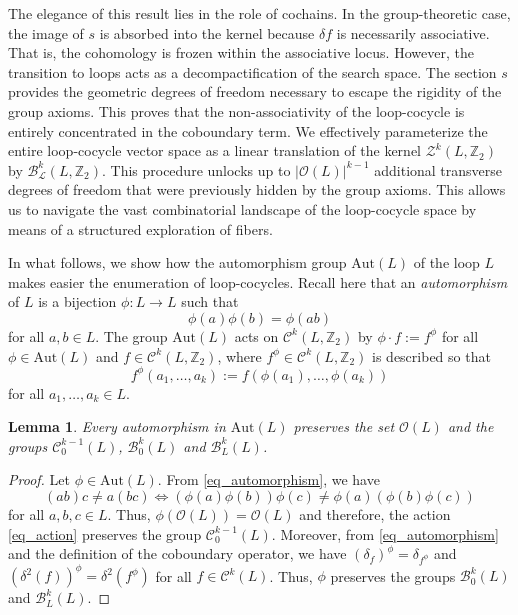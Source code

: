 \documentclass[11pt,a4paper]{article}
\newtheorem{lemma}[theorem]{Lemma}
\begin{document}
The elegance of this result lies in the role of cochains. In the group-theoretic case, the image of $s$ is absorbed into the kernel because $\delta f$ is necessarily associative. That is, the cohomology is frozen within the associative locus. However, the transition to loops acts as a decompactification of the search space. The section $s$ provides the geometric degrees of freedom necessary to escape the rigidity of the group axioms. This proves that the non-associativity of the loop-cocycle is entirely concentrated in the coboundary term. We effectively parameterize the entire loop-cocycle vector space as a linear translation of the kernel $\mathcal{Z}^k(L,\mathbb{Z}_2)$ by $\mathcal{B}^k_\mathcal{L}(L,\mathbb{Z}_2)$. This procedure unlocks up to $|\mathcal{O}(L)|^{k-1}$ additional transverse degrees of freedom that were previously hidden by the group axioms. This allows us to navigate the vast combinatorial landscape of the loop-cocycle space by means of a structured exploration of fibers.

In what follows, we show how the automorphism group $\mathrm{Aut}(L)$ of the loop $L$ makes easier the enumeration of loop-cocycles. Recall here that an {\em automorphism} of $L$ is a bijection $\phi:L\to L$ such that
\begin{equation}\label{eq_automorphism}
\phi(a)\phi(b)=\phi(ab)
\end{equation}
for all $a,b\in L$. The group $\mathrm{Aut}(L)$ acts on $\mathcal{C}^k(L,\mathbb{Z}_2)$ by $\phi\cdot f := f^\phi$ for all $\phi\in\mathrm{Aut}(L)$ and $f\in \mathcal{C}^k(L,\mathbb{Z}_2)$, where $f^\phi\in \mathcal{C}^k(L,\mathbb{Z}_2)$ is described so that
\begin{equation}\label{eq_action}
f^\phi(a_1,\ldots,a_k) := f(\phi(a_1),\ldots,\phi(a_k))
\end{equation}
for all $a_1,\ldots,a_k\in L$.

\begin{lemma}\label{lemma_aut} Every automorphism in $\mathrm{Aut}(L)$ preserves the set $\mathcal{O}(L)$ and the groups $\mathcal{C}_0^{k-1}(L)$, $\mathcal{B}_0^k(L)$ and $\mathcal{B}_L^k(L)$.
\end{lemma}

\begin{proof} Let $\phi\in \mathrm{Aut}(L)$. From \eqref{eq_automorphism}, we have
\[(ab)c\neq a(bc)\Leftrightarrow (\phi(a)\phi(b))\phi(c)\neq \phi(a)(\phi(b)\phi(c))\]
for all $a,b,c\in L$. Thus, $\phi(\mathcal{O}(L))=\mathcal{O}(L)$ and therefore, the action \eqref{eq_action} preserves the group $\mathcal{C}_0^{k-1}(L)$. Moreover, from \eqref{eq_automorphism} and the definition of the coboundary operator, we have $(\delta_f)^\phi=\delta_{f^\phi} $ and $(\delta^2(f))^\phi=\delta^2(f^\phi)$ for all $f\in \mathcal{C}^k(L)$. Thus, $\phi$ preserves the groups $\mathcal{B}_0^k(L)$ and $\mathcal{B}_L^k(L)$.
\end{proof}
\end{document}
